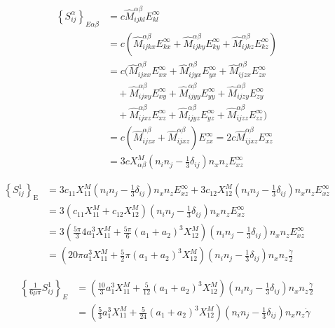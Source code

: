 \documentclass[11pt]{scrartcl}
\begin{document}
\begin{align*}
\left\{
S^{\alpha}_{ij}
\right\}_{E\alpha\beta}
&= 
c \hat{M}_{ijkl}^{\alpha\beta} E_{kl}^{\infty} \\
&=
c (
\hat{M}_{ijkx}^{\alpha\beta} E_{kx}^{\infty}
+
\hat{M}_{ijky}^{\alpha\beta} E_{ky}^{\infty}
+
\hat{M}_{ijkz}^{\alpha\beta} E_{kz}^{\infty}) \\
&=
c (
\hat{M}_{ijxx}^{\alpha\beta} E_{xx}^{\infty}
+
\hat{M}_{ijyx}^{\alpha\beta} E_{yx}^{\infty}
+
\hat{M}_{ijzx}^{\alpha\beta} E_{zx}^{\infty} \\
&\quad 
+
\hat{M}_{ijxy}^{\alpha\beta} E_{xy}^{\infty}
+
\hat{M}_{ijyy}^{\alpha\beta} E_{yy}^{\infty}
+
\hat{M}_{ijzy}^{\alpha\beta} E_{zy}^{\infty} \\
&\quad 
+
\hat{M}_{ijxz}^{\alpha\beta} E_{xz}^{\infty}
+
\hat{M}_{ijyz}^{\alpha\beta} E_{yz}^{\infty} 
+
\hat{M}_{ijzz}^{\alpha\beta} E_{zz}^{\infty}) \\
&=
c(
\hat{M}_{ijzx}^{\alpha\beta}
+
\hat{M}_{ijxz}^{\alpha\beta}
) E_{zx}^{\infty} 
=
2c\hat{M}_{ijxz}^{\alpha\beta}  E_{xz}^{\infty} \\
&=
3c X_{\alpha\beta}^{M}
(n_i n_j-\frac{1}{3}\delta_{ij}) 
n_x n_z E_{xz}^{\infty} 
\end{align*}


\begin{align}
\left\{
S_{ij}^{1}
\right\}_{\mathrm{E}}
 &= 
 3 c_{11} X_{11}^{M}
(n_i n_j-\frac{1}{3}\delta_{ij}) 
n_x n_z E_{xz}^{\infty} 
+
3 c_{12 }X_{12}^{M}
(n_i n_j-\frac{1}{3}\delta_{ij}) 
n_x n_z E_{xz}^{\infty}  \\
&= 3 (
c_{11} X_{11}^{M}
+ 
c_{12} X_{12}^{M})
(n_i n_j-\frac{1}{3}\delta_{ij})
n_x n_z E_{xz}^{\infty} 
 \\
&= 3 (
\frac{5\pi}{3} 4 a_1^3 X_{11}^{M}
+ 
\frac{5\pi}{6} (a_1 + a_2)^3 X_{12}^{M})
(n_i n_j-\frac{1}{3}\delta_{ij})
n_x n_z E_{xz}^{\infty} 
 \\
&=  (
20\pi  a_1^3  X_{11}^{M}
+ 
\frac{5}{2}\pi (a_1+a_2)^3 X_{12}^{M})
(n_i n_j-\frac{1}{3}\delta_{ij}) 
n_x n_z \frac{\dot{\gamma}}{2}
\end{align}

\begin{align*}
\left\{
\frac{1}{6\mu\pi} S_{ij}^{1} 
\right\}_{E}
&= 
  (
\frac{10}{3}  a_1^3  X_{11}^{M}
+ 
\frac{5}{12} (a_1+a_2)^3 X_{12}^{M})
(n_i n_j-\frac{1}{3}\delta_{ij}) 
n_x n_z \frac{\dot{\gamma}}{2}
\\
&=
  (
\frac{5}{3}  a_1^3  X_{11}^{M}
+ 
\frac{5}{24} (a_1+a_2)^3 X_{12}^{M})
(n_i n_j-\frac{1}{3}\delta_{ij}) 
n_x n_z \dot{\gamma}
\end{align*}
\end{document}
